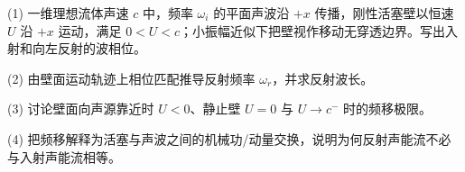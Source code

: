 (1) 一维理想流体声速 \(c\) 中，频率 \(\omega_i\) 的平面声波沿 \(+x\) 传播，刚性活塞壁以恒速 \(U\) 沿 \(+x\) 运动，满足 \(0<U<c\)；小振幅近似下把壁视作移动无穿透边界。写出入射和向左反射的波相位。

(2) 由壁面运动轨迹上相位匹配推导反射频率 \(\omega_r\)，并求反射波长。

(3) 讨论壁面向声源靠近时 \(U<0\)、静止壁 \(U=0\) 与 \(U\to c^-\) 时的频移极限。

(4) 把频移解释为活塞与声波之间的机械功/动量交换，说明为何反射声能流不必与入射声能流相等。
